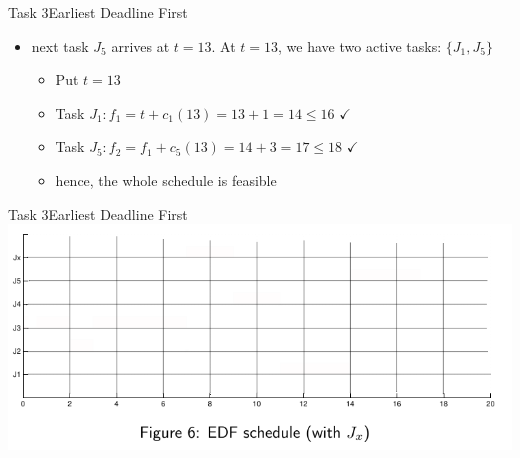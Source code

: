 \begin{frame}[allowframebreaks]{Task 3}{Earliest Deadline First\vspace{0.5cm}}
\begin{itemize}
  \begin{itemize}
    \item Put $t=8$
    \item Task $J_x: f_1=t+c_x(8)=8+1=9 \leq 10$ $\checkmark$
    \item Task $J_4: f_2=f_1+c_4(8)=9+2=11 \leq 11$ $\checkmark$
    \item Task $J_1: f_3=f_2+c_1(8)=11+3=14 \leq 16$ $\checkmark$
    \item Thus, at $t=8$ \alert{all} tasks in the system are feasible.
  \end{itemize}
\item next task $J_5$ arrives at $t=13$. At $t=13$, we have two active tasks: $\{J_1, J_5\}$
    \begin{itemize}
      \item Put $t=13$
      \item Task $J_1: f_1=t+c_1(13)=13+1=14 \leq 16$ $\checkmark$
      \item Task $J_5: f_2=f_1+c_5(13)=14+3=17 \leq 18$ $\checkmark$
      \item hence, the whole \alert{schedule is feasible}
    \end{itemize}
  \end{itemize}
\end{frame}

\begin{frame}{Task 3}{Earliest Deadline First}
  \includegraphics[width=\textwidth]{./figures/3_empty_2.png}
\end{frame}


